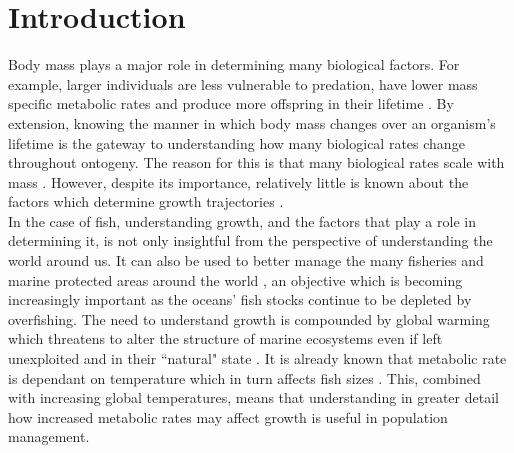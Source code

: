 \documentclass[a4paper, 11pt, hidelinks]{article} %
\begin{document}
	\nolinenumbers
	
	\tableofcontents
	\newpage

\section{Introduction}
	\linenumbers


	Body mass plays a major role in determining many biological factors.  For example, larger individuals are less vulnerable to predation, have lower mass specific metabolic rates and produce more offspring in their lifetime \parencite{Peters1983, Barneche2018, Craig2006, Magnhagen2001, Hixon2014, Marshall2006}.
	By extension, knowing the manner in which body mass changes over an organism's lifetime is the gateway to understanding how many biological rates change throughout ontogeny.  The reason for this is that many biological rates scale with mass \parencite{Kleiber1932}.  However, despite its importance, relatively little is known about the factors which determine growth trajectories \parencite{Arendt2011, Marshall2019}.
	\\
	In the case of fish, understanding growth, and the factors that play a role in determining it, is not only insightful from the perspective of understanding the world around us.  It can also be used to better manage the many fisheries and marine protected areas around the world \parencite{Heino2013, Lester2009}, an objective which is becoming increasingly important as the oceans' fish stocks continue to be depleted by overfishing. 
	The need to understand growth is compounded by global warming which threatens to alter the structure of marine ecosystems even if left unexploited and in their ``natural" state \parencite{Bruno2018}.
	It is already known that metabolic rate is dependant on temperature which in turn affects fish sizes \parencite{Gillooly2001, Brown2004}.  This, combined with increasing global temperatures, means that understanding in greater detail how increased metabolic rates %
	may affect growth is useful in population management.
\end{document}
